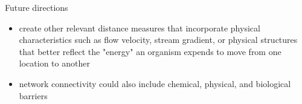 \documentclass[12pt]{amsart}
\begin{document}
Future directions
\begin{itemize}
\item create other relevant distance measures that incorporate physical characteristics such as flow velocity, stream gradient, or physical structures that better reflect the "energy" an organism expends to move from one location to another
\item network connectivity could also include chemical, physical, and biological barriers
\end{itemize}
\end{document}
